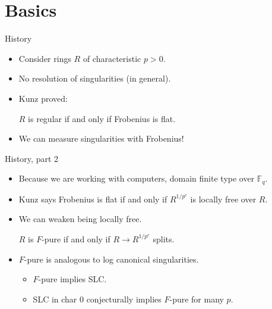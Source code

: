 \documentclass[xcolor=dvipsnames]{beamer}
\subtitle
{The {\tt TestIdeals} package for Macaulay2}
\author[BeBoBrElHeKaKaMaMaMoRoScSmTeWi] %
{Erin Bela, Alberto F. Boix, Juliette Bruce, Drew Ellingson, Daniel Hern\'andez, Zhibek Kadyrsizova, Mordechai Katzman, Sara Malec, Matthew Mastroeni, Maral Mostafazadehfard, Marcus Robinson, Karl Schwede\inst{1}, Daniel Smolkin, Pedro Teixeira, Emily Witt}
\institute[AMS Sectional Meeting, University of Arkansas] %
{
  \inst{1}%
  Department of Mathematics\\
  University of Utah}
\date[2018] %
{AMS Sectional Meeting, University of Arkansas\\2018}
\newcommand{\bF}{\mathbb{F}}
\theoremstyle{remark}
\begin{document}
\begin{frame}
  \titlepage
\end{frame}






\section{Basics}

\begin{frame}[t]{History}
\begin{itemize}
\item<1-> Consider rings $R$ of characteristic $p > 0$.
\item<2-> No resolution of singularities (in general).
\item<3-> Kunz proved:
\vskip 3pt
\begin{theorem}[Kunz]
$R$ is regular if and only if Frobenius is flat.
\end{theorem}
\item<4->  We can measure singularities with Frobenius!
\end{itemize}
\end{frame}

\begin{frame}[t]{History, part 2}
\begin{itemize}
\item<1->  Because we are working with computers, domain finite type over $\bF_q$.
\item<2->  Kunz says Frobenius is flat if and only if $R^{1/p^e}$ is locally free over $R$.
\item<3->  We can weaken being locally free.
\begin{definition}
  $R$ is $F$-pure if and only if $R \to R^{1/p^e}$ splits.
\end{definition}
\item<4->  $F$-pure is analogous to log canonical singularities.
\begin{itemize}
  \item<5->  $F$-pure implies SLC.
  \item<6->  SLC in char 0 conjecturally implies $F$-pure for many $p$.
\end{itemize}
\end{itemize}
\end{frame}
\end{document}
